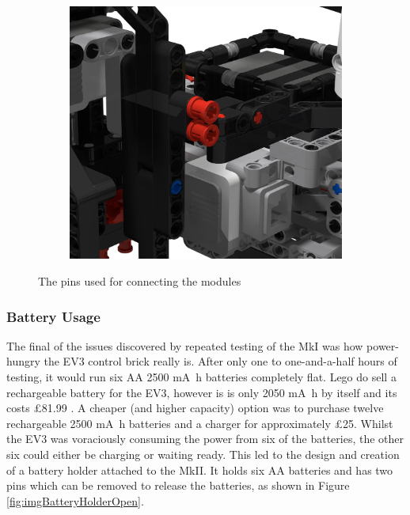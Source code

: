 \documentclass{report}
\begin{document}
\begin{figure}[H]
\begin{subfigure}[b]{0.25\textwidth}
			\label{fig:rdrModulePins2}
		\end{subfigure}
		\hspace{10mm}
		\begin{subfigure}[b]{0.25\textwidth}
			\includegraphics[width=\textwidth]{Resources/Images/rdrModulePins3.png}
			\label{fig:rdrModulePins3}
		\end{subfigure}
		\caption{The pins used for connecting the modules}
		\label{fig:rdrModulePins}
	\end{figure}
	
	\subsubsection{Battery Usage}
	
	The final of the issues discovered by repeated testing of the MkI was how power-hungry the EV3 control brick really is. After only one to one-and-a-half hours of testing, it would run six AA 2500 \si{\milli\ampere\hour} batteries completely flat. Lego do sell a rechargeable battery for the EV3, however is is only 2050 \si{\milli\ampere\hour} by itself and its costs \pounds81.99 \cite{Lego2018}. A cheaper (and higher capacity) option was to purchase twelve rechargeable 2500 \si{\milli\ampere\hour} batteries and a charger for approximately \pounds25. Whilst the EV3 was voraciously consuming the power from six of the batteries, the other six could either be charging or waiting ready. This led to the design and creation of a battery holder attached to the MkII. It holds six AA batteries and has two pins which can be removed to release the batteries, as shown in Figure \ref{fig:imgBatteryHolderOpen}.
	
\end{document}
